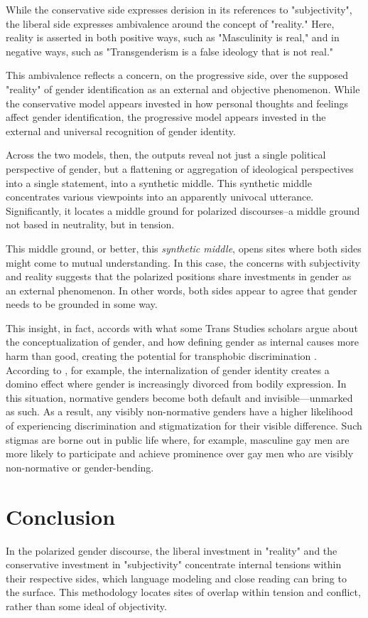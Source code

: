 \documentclass[letterpaper]{article} %
\begin{document}
While the conservative side expresses derision in its references to "subjectivity", the liberal side expresses ambivalence around the concept of "reality." Here, reality is asserted in both positive ways, such as "Masculinity is real," and in negative ways, such as "Transgenderism is a false ideology that is not real." 

This ambivalence reflects a concern, on the progressive side, over the supposed "reality" of gender identification as an external and objective phenomenon. While the conservative model appears invested in how personal thoughts and feelings affect gender identification, the progressive model appears invested in the external and universal recognition of gender identity.

Across the two models, then, the outputs reveal not just a single political perspective of gender, but a flattening or aggregation of ideological perspectives into a single statement, into a synthetic middle. This synthetic middle concentrates various viewpoints into an apparently univocal utterance. Significantly, it locates a middle ground for polarized discourses--a middle ground not based in neutrality, but in tension.

This middle ground, or better, this \textit{synthetic middle}, opens sites where both sides might come to mutual understanding. In this case, the concerns with subjectivity and reality suggests that the polarized positions share investments in gender as an external phenomenon. In other words, both sides appear to agree that gender needs to be grounded in some way. 

This insight, in fact, accords with what some Trans Studies scholars argue about the conceptualization of gender, and how defining gender as internal causes more harm than good, creating the potential for transphobic discrimination \citep{amin_2022,chu_2024}. According to \citet{amin_2022}, for example, the internalization of gender identity creates a domino effect where gender is increasingly divorced from bodily expression. In this situation, normative genders become both default and invisible—unmarked as such. As a result, any visibly non-normative genders have a higher likelihood of experiencing discrimination and stigmatization for their visible difference. Such stigmas are borne out in public life where, for example, masculine gay men are more likely to participate and achieve prominence over gay men who are visibly non-normative or gender-bending.

\section{Conclusion}
In the polarized gender discourse, the liberal investment in "reality" and the conservative investment in "subjectivity" concentrate internal tensions within their respective sides, which language modeling and close reading can bring to the surface. This methodology locates sites of overlap within tension and conflict, rather than some ideal of objectivity.
\end{document}
